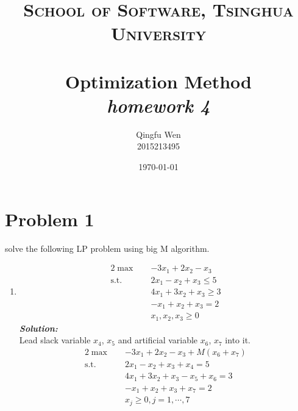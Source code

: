 \documentclass[paper=a4, fontsize=11pt]{scrartcl} %
\title{	
\normalfont \normalsize
\textsc{School of Software, Tsinghua University} \\ [25pt] %
\horrule{0.5pt} \\[0.4cm] %
\huge Optimization Method\\ %
\LARGE\textit{homework 4}
\horrule{2pt} \\[0.5cm] %
}
\author{Qingfu Wen \\ \normalsize 2015213495} %
\date{\normalsize\today} %
\numberwithin{equation}{section} %
\numberwithin{figure}{section} %
\numberwithin{table}{section} %
\begin{document}
\maketitle %
\tableofcontents
\newpage

\section{Problem 1}
solve the following LP problem using big M algorithm.
\begin{enumerate}
\item
\begin{alignat}{2}          \nonumber
\max\quad & -3x_1+2x_2-x_3 \\    \nonumber
\mbox{s.t.}\quad            \nonumber
& 2x_1-x_2+x_3 \leq 5\\        \nonumber
& 4x_1+3x_2+x_3 \geq 3\\         \nonumber
& -x_1+x_2+x_3 = 2\\          \nonumber
& x_1,x_2,x_3 \geq 0
\end{alignat}
\emph{\textbf{Solution:}}\\

Lead slack variable $x_4$, $x_5$ and artificial variable $x_6$, $x_7$ into it.
\begin{alignat}{2}          \nonumber
\max\quad & -3x_1+2x_2-x_3+M(x_6+x_7) \\    \nonumber
\mbox{s.t.}\quad            \nonumber
& 2x_1-x_2+x_3+x_4 = 5\\        \nonumber
& 4x_1+3x_2+x_3-x_5+x_6= 3\\         \nonumber
& -x_1+x_2+x_3+x_7 = 2\\          \nonumber
& x_j \geq 0, j = 1,\cdots,7
\end{alignat}


\end{enumerate}
\end{document}

